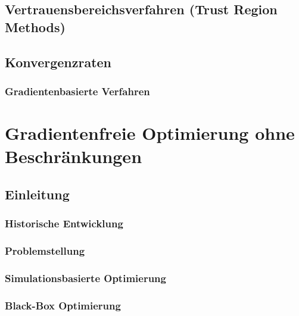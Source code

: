     \section{Vertrauensbereichsverfahren (Trust Region Methods)} %

    \section{Konvergenzraten} %

        \subsection{Gradientenbasierte Verfahren} %

\chapter{Gradientenfreie Optimierung ohne Beschränkungen} %

    \section{Einleitung} %

    	\subsection{Historische Entwicklung} %

        \subsection{Problemstellung} %

        \subsection{Simulationsbasierte Optimierung} %

        \subsection{Black-Box Optimierung} %

